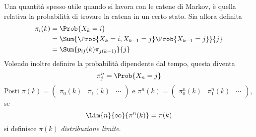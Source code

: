 \documentclass{subfiles}
\begin{document}
Una quantità spesso utile quando si lavora con le catene di Markov, è quella relativa la probabilità di trovare la catena in un certo stato.
Sia allora definita
\[\begin{aligned}
        \pi_{i}(k) & = \Prob{X_{k} = i}                                             \\
                   & = \Sum{\Prob{X_{k} = i, X_{k - 1} = j}\Prob{X_{k - 1} = j}}{j} \\
                   & = \Sum{p_{ij}(k)\pi_{j(k - 1)}}{j}                             \\
    \end{aligned}\]
Volendo inoltre definire la probabilità dipendente dal tempo, questa diventa
\[
    \pi_{j}^{n} = \Prob{X_{n} = j}
\]
Posti \(\pi(k) = \begin{pmatrix} \pi_{0}(k) & \pi_{1}(k) & \cdots \end{pmatrix}\) e \(\pi^{n}(k) = \begin{pmatrix} \pi_{0}^{n}(k) & \pi_{1}^{n}(k) & \cdots \end{pmatrix}\),
se
\[
    \Lim{n}{\infty}{\pi^{n}(k)} = \pi(k)
\]
si definisce \(\pi(k)\) \emph{distribuzione limite}.
\end{document}
